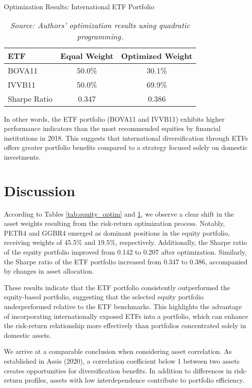 \documentclass{article}
\begin{document}
\begin{table}[htbp]
\centering
\caption{Optimization Results: International ETF Portfolio}
\label{tab:etf_optim}
\begin{tabular}{lcc}
\toprule
ETF & Equal Weight & Optimized Weight \\
\midrule
BOVA11 & 50.0\% & 30.1\% \\
IVVB11 & 50.0\% & 69.9\% \\
\midrule
Sharpe Ratio & 0.347 & 0.386 \\
\bottomrule
\end{tabular}

\vspace{0.4cm}
\caption*{\textit{Source: Authors' optimization results using quadratic programming.}}
\end{table}

In other words, the ETF portfolio (BOVA11 and IVVB11) exhibits higher performance indicators than the most recommended equities by financial institutions in 2018. This suggests that international diversification through ETFs offers greater portfolio benefits compared to a strategy focused solely on domestic investments.

\section{Discussion}

According to Tables \ref{tab:equity_optim} and \ref{tab:etf_optim}, we observe a clear shift in the asset weights resulting from the risk-return optimization process. Notably, PETR4 and GGBR4 emerged as dominant positions in the equity portfolio, receiving weights of 45.5\% and 19.5\%, respectively. Additionally, the Sharpe ratio of the equity portfolio improved from 0.142 to 0.207 after optimization. Similarly, the Sharpe ratio of the ETF portfolio increased from 0.347 to 0.386, accompanied by changes in asset allocation.

These results indicate that the ETF portfolio consistently outperformed the equity-based portfolio, suggesting that the selected equity portfolio underperformed relative to the ETF benchmarks. This highlights the advantage of incorporating internationally exposed ETFs into a portfolio, which can enhance the risk-return relationship more effectively than portfolios concentrated solely in domestic assets.

We arrive at a comparable conclusion when considering asset correlation. As established in Assis (2020), a correlation coefficient below 1 between two assets creates opportunities for diversification benefits. In addition to differences in risk-return profiles, assets with low interdependence contribute to portfolio efficiency.
\end{document}
